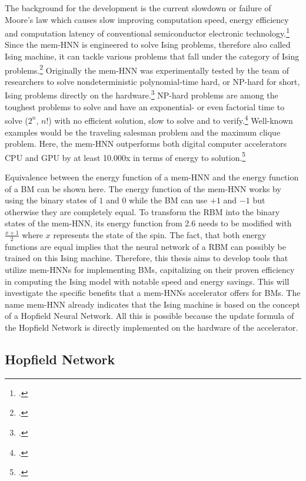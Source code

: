 The background for the development is the current slowdown or failure of Moore's law which causes slow improving computation speed, energy efficiency and computation latency of conventional semiconductor electronic technology.\footcite[cf.][1]{caiHarnessingIntrinsicNoise2019}
Since the \ac{mem-HNN} is engineered to solve Ising problems, therefore also called Ising machine, it can tackle various problems that fall under the category of Ising problems.\footcite[cf.][363]{mohseniIsingMachinesHardware2022a}
Originally the \ac{mem-HNN} was experimentally tested by the team of researchers to solve nondeterministic polynomial-time hard, or NP-hard for short, Ising problems directly on the hardware.\footcite[cf.][410]{caiPowerefficientCombinatorialOptimization2020}
NP-hard problems are among the toughest problems to solve and have an exponential- or even factorial time to solve (\( 2^{n} \), \( n{!} \)) with no efficient solution, slow to solve and to verify.\footcite[cf.][497-500]{izadkhahNPNPCompleteNPHard2022}
Well-known examples would be the traveling salesman problem and the maximum clique problem. 
Here, the \ac{mem-HNN} outperforms both digital computer accelerators \ac{CPU} and \ac{GPU} by at least 10.000x in terms of energy to solution.\footcite[cf.][470]{caiPowerefficientCombinatorialOptimization2020}

Equivalence between the energy function of a \ac{mem-HNN} and the energy function of a \ac{BM} can be shown here.
The energy function of the \ac{mem-HNN} works by using the binary states of \( 1 \) and \( 0 \) while the \ac{BM} can use \( +1 \) and \( -1 \) but otherwise they are completely equal.
To transform the \ac{RBM} into the binary states of the \ac{mem-HNN}, its energy function from 2.6 needs to be modified with \(\frac{x + 1}{2}\) where \( x \) represents the state of the spin.
The fact, that both energy functions are equal implies that the neural network of a \ac{RBM} can possibly be trained on this Ising machine.
Therefore, this thesis aims to develop tools that utilize \ac{mem-HNN}s for implementing \ac{BM}s, capitalizing on their proven efficiency in computing the Ising model with notable speed and energy savings.
This will investigate the specific benefits that a \ac{mem-HNN}s accelerator offers for \ac{BM}s.
The name \ac{mem-HNN} already indicates that the Ising machine is based on the concept of a Hopfield Neural Network.
All this is possible because the update formula of the Hopfield Network is directly implemented on the hardware of the accelerator.

\subsection{Hopfield Network}

